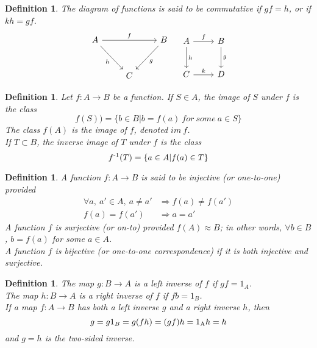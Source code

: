 \documentclass[a4paper,8pt]{article}
\newcommand{\hlt}[1]{\textit{{\color{blue}#1}}}
\theoremstyle{theorem}
\newtheorem{definition}[theorem]{Definition}
\begin{document}
\begin{definition}
The \hlt{diagram of functions} is said to be commutative if $ gf = h $, or if $ kh = gf $.\\

\begin{equation}
\label{diagram}
\begin{tikzcd}
A \arrow{rr}{f} \arrow[swap]{dr}{h} & & B \arrow{dl}{g} \\[10pt]
    & C
\end{tikzcd}
\quad
\begin{tikzcd}[row sep=2.5em]
 A \ar{r}{f} \ar{d}{h} & B \ar{d}{g} \\
 C \ar{r}{k} & D
\end{tikzcd}
\nonumber
\end{equation}
\end{definition}


\begin{definition}
Let $ f: A \rightarrow B $ be a function. If $ S \in A $, \hlt{the image of $ S $ under $ f $} is the class
\begin{equation}
f(S)) = \{ b \in B | b=f(a) \ for \ some \ a \in S\} \nonumber
\end{equation}
The class $ f(A) $ is the \hlt{image of $ f $}, denoted $ im \ f $.\\
If $ T \subset B $, the \hlt{inverse image of $ T $} under $ f $ is the class 
\begin{equation}
f \textsuperscript{-1} (T) = \{ a \in A | f(a) \in T\} \nonumber
\end{equation}
\end{definition}


\begin{definition}
A function $ f: A \rightarrow B$ is said to be \hlt{injective} (or one-to-one) provided 
\begin{align}
\forall a, \ a' \in A, \ a \neq a' & \Rightarrow f(a) \neq f(a') \nonumber \\
f(a) = f(a') & \Rightarrow a = a' \nonumber
\end{align}
A function $ f $ is \hlt{surjective} (or on-to) provided $ f(A) \approx B $; in other words, $\forall b \in B $, $ b=f(a) $ for some $ a \in A $.\\
A function $ f $ is \hlt{bijective} (or one-to-one correspondence) if it is both injective and surjective.\\
\end{definition}


\begin{definition}
The map $ g: B \rightarrow A $ is a \hlt{left inverse} of $ f $ if $ gf = 1_A $.\\
The map $ h: B \rightarrow A $ is a \hlt{right inverse} of $ f $ if $ fb = 1_B $.\\
If a map $ f: A \rightarrow B $ has both a left inverse $ g $ and a right inverse $ h $, then
\begin{equation}
g = g1_B = g(fh) = (gf)h = 1 \textsubscript{A} h = h
\nonumber	
\end{equation}
and $ g=h $ is the \hlt{two-sided inverse}.\\
\end{definition}
\end{document}
